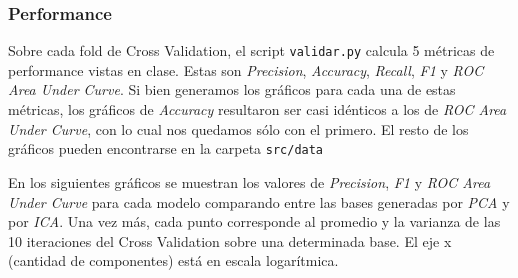 \documentclass[10pt, a4paper]{article}
\begin{document}
\subsubsection{Performance}

Sobre cada fold de Cross Validation, el script \texttt{validar.py} calcula 5 métricas de performance vistas en clase. Estas son \textit{Precision}, \textit{Accuracy}, \textit{Recall}, \textit{F1} y \textit{ROC Area Under Curve}. Si bien generamos los gráficos para cada una de estas métricas, los gráficos de \textit{Accuracy} resultaron ser casi idénticos a los de \textit{ROC Area Under Curve}, con lo cual nos quedamos sólo con el primero. El resto de los gráficos pueden encontrarse en la carpeta \texttt{src/data}

En los siguientes gráficos se muestran los valores de \textit{Precision}, \textit{F1} y \textit{ROC Area Under Curve} para cada modelo comparando entre las bases generadas por \textit{PCA} y por \textit{ICA}. Una vez más, cada punto corresponde al promedio y la varianza de las 10 iteraciones del Cross Validation sobre una determinada base. El eje x (cantidad de componentes) está en escala logarítmica.
\end{document}
